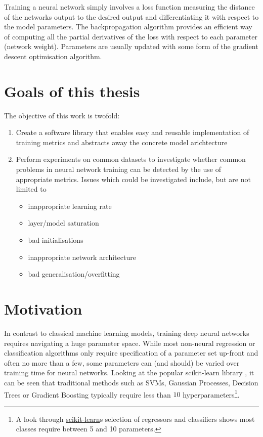 Training a neural network simply involves a loss function measuring the distance
of the networks output to the desired output and differentiating it with respect
to the model parameters. The backpropagation algorithm provides an efficient way
of computing all the partial derivatives of the loss with respect to each
parameter (network weight). Parameters are usually updated with some form of the
gradient descent optimisation algorithm.

\hypertarget{sec:thesis-goals}{%
\section{Goals of this thesis}\label{sec:thesis-goals}}

The objective of this work is twofold:

\begin{enumerate}
    \item
        Create a software library that enables easy and reusable
        implementation of training metrics and abstracts away the concrete model
        arichtecture
    \item
        Perform experiments on common datasets to investigate whether common
        problems in neural network training can be detected by the use of
        appropriate metrics. Issues which could be investigated include, but are
        not limited to
        \begin{itemize}
            \item
                inappropriate learning rate
            \item
                layer/model saturation
            \item
                bad initialisations
            \item
                inappropriate network architecture
            \item
                bad generalisation/overfitting
        \end{itemize}
\end{enumerate}

\hypertarget{sec:motivation}{%
\section{Motivation}\label{sec:motivation}}

In contrast to classical machine learning models, training deep neural networks
requires navigating a huge parameter space. While most non-neural regression or
classification algorithms only require specification of a parameter set up-front
and often no more than a few, some parameters can (and should) be varied over
training time for neural networks. Looking at the popular scikit-learn library \citep{scikit-learn},
it can be seen that traditional methods such as SVMs, Gaussian Processes,
Decision Trees or Gradient Boosting typically require less than $10$
hyperparameters\footnote{A look through
\href{http://scikit-learn.org/stable/supervised_learning.html\#supervised-learning}{scikit-learn}s
selection of regressors and classifiers shows most classes require between 5 and
10 parameters.}.

